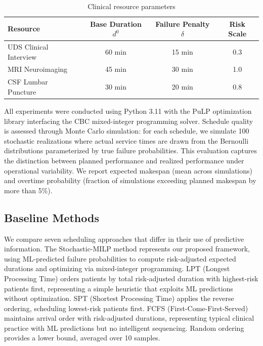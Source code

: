 \documentclass[11pt,a4paper]{article}
\begin{document}
\begin{table}[htbp]
\centering
\caption{Clinical resource parameters}
\label{tab:resource_params}
\begin{tabular}{@{}lccc@{}}
\toprule
\textbf{Resource} & \textbf{Base Duration} $d^0$ & \textbf{Failure Penalty} $\delta$ & \textbf{Risk Scale} \\
\midrule
UDS Clinical Interview & 60 min & 15 min & 0.3 \\
MRI Neuroimaging & 45 min & 30 min & 1.0 \\
CSF Lumbar Puncture & 30 min & 20 min & 0.8 \\
\bottomrule
\end{tabular}
\end{table}

All experiments were conducted using Python 3.11 with the PuLP optimization library interfacing the CBC mixed-integer programming solver. Schedule quality is assessed through Monte Carlo simulation: for each schedule, we simulate 100 stochastic realizations where actual service times are drawn from the Bernoulli distributions parameterized by true failure probabilities. This evaluation captures the distinction between planned performance and realized performance under operational variability. We report expected makespan (mean across simulations) and overtime probability (fraction of simulations exceeding planned makespan by more than 5\%).

\subsection{Baseline Methods}
\label{sec:baselines}

We compare seven scheduling approaches that differ in their use of predictive information. The Stochastic-MILP method represents our proposed framework, using ML-predicted failure probabilities to compute risk-adjusted expected durations and optimizing via mixed-integer programming. LPT (Longest Processing Time) orders patients by total risk-adjusted duration with highest-risk patients first, representing a simple heuristic that exploits ML predictions without optimization. SPT (Shortest Processing Time) applies the reverse ordering, scheduling lowest-risk patients first. FCFS (First-Come-First-Served) maintains arrival order with risk-adjusted durations, representing typical clinical practice with ML predictions but no intelligent sequencing. Random ordering provides a lower bound, averaged over 10 samples.
\end{document}
